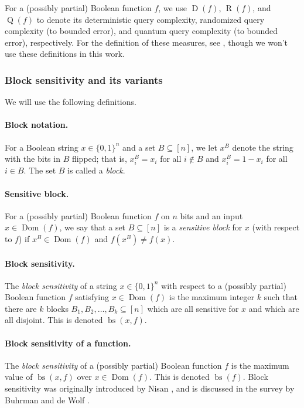 \documentclass[10pt,a4paper]{article}
\theoremstyle{definition}
\DeclareMathOperator{\Dom}{Dom}
\newcommand{\B}{\{0,1\}}
\renewcommand{\>}{\rangle}
\newcommand{\<}{\langle}
\DeclareMathOperator{\D}{D}
\DeclareMathOperator{\R}{R}
\DeclareMathOperator{\Q}{Q}
\DeclareMathOperator{\bs}{bs}
\begin{document}
For a (possibly partial) Boolean function $f$, we use
$\D(f)$, $\R(f)$, and $\Q(f)$ to denote its deterministic
query complexity, randomized query complexity (to bounded error),
and quantum query complexity (to bounded error), respectively.
For the definition of these measures, see \cite{BdW02},
though we won't use these definitions in this work.

\subsubsection{Block sensitivity and its variants}

We will use the following definitions.

\paragraph{Block notation.} For a Boolean string $x\in\B^n$
and a set $B\subseteq[n]$, we let $x^B$ denote the
string with the bits in $B$ flipped; that is,
$x^B_i=x_i$ for all $i\notin B$ and $x^B_i=1-x_i$ for all $i\in B$.
The set $B$ is called a \emph{block}.

\paragraph{Sensitive block.} For a (possibly partial) Boolean
function $f$ on $n$ bits and an input $x\in\Dom(f)$, we say that
a set $B\subseteq[n]$ is a \emph{sensitive block} for $x$
(with respect to $f$) if $x^B\in\Dom(f)$ and $f(x^B)\ne f(x)$.

\paragraph{Block sensitivity.} The \emph{block sensitivity}
of a string $x\in\B^n$ with respect to a (possibly partial)
Boolean function $f$ satisfying $x\in\Dom(f)$ is the maximum
integer $k$ such that there are $k$ blocks
$B_1,B_2,\dots,B_k\subseteq[n]$ which are all sensitive
for $x$ and which are all disjoint. This is denoted
$\bs(x,f)$.

\paragraph{Block sensitivity of a function.} The
\emph{block sensitivity} of a (possibly partial) Boolean function
$f$ is the maximum value of $\bs(x,f)$ over $x\in\Dom(f)$.
This is denoted $\bs(f)$.
Block sensitivity was originally introduced by Nisan
\cite{Nis91}, and is discussed in the survey by Buhrman and
de Wolf \cite{BdW02}.
\end{document}
